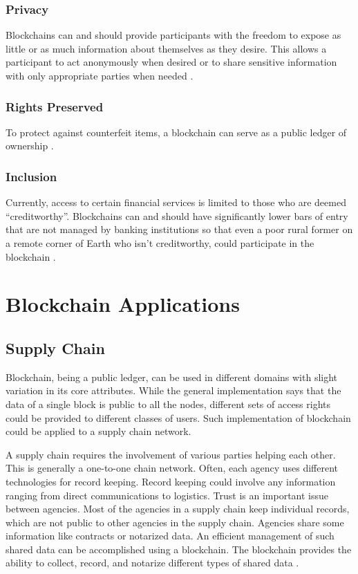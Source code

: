 \documentclass[sigconf]{acmart}
\begin{document}
\subsubsection{Privacy} Blockchains can and should provide participants with the freedom to expose as little or as much information about themselves as they desire. This allows a participant to act anonymously when desired or to share sensitive information with only appropriate parties when needed \cite{tapscott}.

\subsubsection{Rights Preserved} To protect against counterfeit items, a blockchain can serve as a public ledger of ownership \cite{tapscott}.

\subsubsection{Inclusion} Currently, access to certain financial services is limited to those who are deemed ``creditworthy''. Blockchains can and should have significantly lower bars of entry that are not managed by banking institutions so that even a poor rural former on a remote corner of Earth who isn't creditworthy, could participate in the blockchain \cite{tapscott}.

\section{Blockchain Applications}
\subsection{Supply Chain}
Blockchain, being a public ledger, can be used in different domains with slight variation in its core attributes. While the general implementation says that the data of a single block is public to all the nodes, different sets of access rights could be provided to different classes of users.  Such implementation of blockchain could be applied to a supply chain network. 

A supply chain requires the involvement of various parties helping each other. This is generally a one-to-one chain network. Often, each agency uses different technologies for record keeping. Record keeping could involve any information ranging from direct communications to logistics. Trust is an important issue between agencies. Most of the agencies in a supply chain keep individual records, which are not public to other agencies in the supply chain. Agencies share some information like contracts or notarized data. An efficient management of such shared data can be accomplished using a blockchain. The blockchain provides the ability to collect, record, and notarize different types of shared data \cite{arbc1}. 
\end{document}

